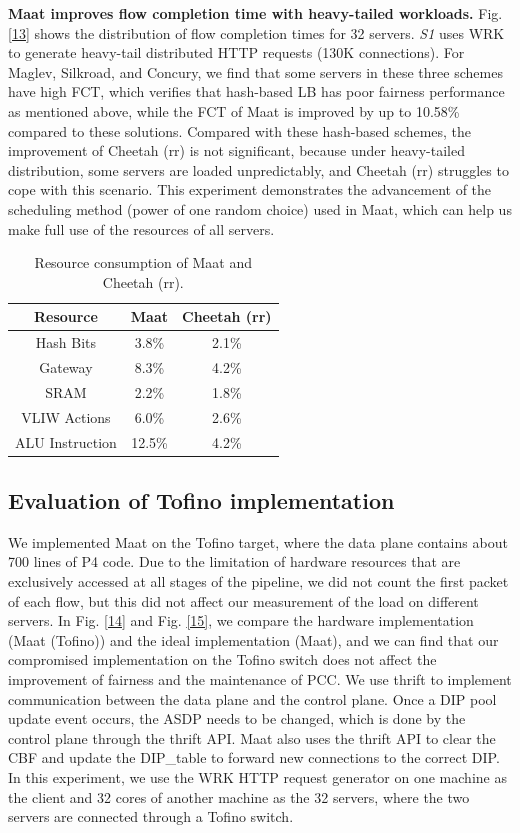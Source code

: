 \textbf{Maat improves flow completion time with heavy-tailed workloads.} Fig. \ref{13} shows the distribution of flow completion times for 32 servers. \emph{S1} uses WRK to generate heavy-tail distributed HTTP requests (130K connections). For Maglev, Silkroad, and Concury, we find that some servers in these three schemes have high FCT, which verifies that hash-based LB has poor fairness performance as mentioned above, while the FCT of Maat is improved by up to 10.58\% compared to these solutions. Compared with these hash-based schemes, the improvement of Cheetah (rr) is not significant, because under heavy-tailed distribution, some servers are loaded unpredictably, and Cheetah (rr) struggles to cope with this scenario. This experiment demonstrates the advancement of the scheduling method (power of one random choice) used in Maat, which can help us make full use of the resources of all servers.

\begin{table}[tbp]
	\centering
	\caption{Resource consumption of Maat and Cheetah (rr).}
	\begin{tabular}{|c|c|c|} %
		\hline 
		Resource&Maat&Cheetah (rr)\\
		\hline  
		Hash Bits&3.8\%&2.1\%\\
		\hline
		Gateway &8.3\%&4.2\%\\
		\hline
		SRAM &2.2\%&1.8\%\\
		\hline
		VLIW Actions&6.0\%&2.6\%\\
		\hline
		ALU Instruction&12.5\%&4.2\%\\
		\hline
	\end{tabular}
	\label{1}
	\vspace{-1em}
\end{table}

\subsection{Evaluation of Tofino implementation}
We implemented Maat on the Tofino target, where the data plane contains about 700 lines of P4 code. Due to the limitation of hardware resources that are exclusively accessed at all stages of the pipeline, we did not count the first packet of each flow, but this did not affect our measurement of the load on different servers. In Fig. \ref{14} and Fig. \ref{15}, we compare the hardware implementation (Maat (Tofino)) and the ideal implementation (Maat), and we can find that our compromised implementation on the Tofino switch does not affect the improvement of fairness and the maintenance of PCC. We use thrift to implement communication between the data plane and the control plane. Once a DIP pool update event occurs, the ASDP needs to be changed, which is done by the control plane through the thrift API. Maat also uses the thrift API to clear the CBF and update the DIP_table to forward new connections to the correct DIP. In this experiment, we use the WRK HTTP request generator on one machine as the client and 32 cores of another machine as the 32 servers, where the two servers are connected through a Tofino switch.

